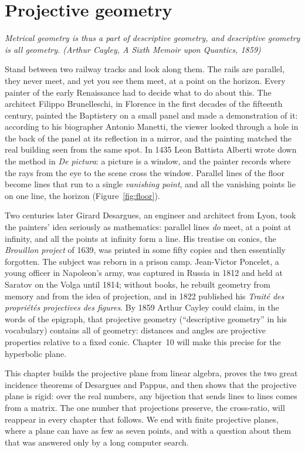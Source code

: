 \chapter{Projective geometry}\label{ch:projective}

\begin{center}\itshape
Metrical geometry is thus a part of descriptive geometry, and descriptive geometry is all geometry.
\upshape(Arthur Cayley, \emph{A Sixth Memoir upon Quantics}, 1859)
\end{center}

Stand between two railway tracks and look along them. The rails are parallel, they never meet, and yet you see them meet, at a point on
the horizon. Every painter of the early Renaissance had to decide what to do about this. The architect Filippo Brunelleschi, in Florence in
the first decades of the fifteenth century, painted the Baptistery on a small panel and made a demonstration of it: according to his
biographer Antonio Manetti, the viewer looked through a hole in the back of the panel at its reflection in a mirror, and the painting
matched the real building seen from the same spot. In 1435 Leon Battista Alberti wrote down the method in \emph{De pictura}: a picture is a
window, and the painter records where the rays from the eye to the scene cross the window. Parallel lines of the floor become lines that run
to a single \emph{vanishing point}, and all the vanishing points lie on one line, the horizon (Figure~\ref{fig:floor}).

Two centuries later Girard Desargues, an engineer and architect from Lyon, took the painters' idea seriously as mathematics: parallel lines
\emph{do} meet, at a point at infinity, and all the points at infinity form a line. His treatise on conics, the \emph{Brouillon project} of
1639, was printed in some fifty copies and then essentially forgotten. The subject was reborn in a prison camp. Jean-Victor Poncelet, a young
officer in Napoleon's army, was captured in Russia in 1812 and held at Saratov on the Volga until 1814; without books, he rebuilt geometry
from memory and from the idea of projection, and in 1822 published his \emph{Trait\'e des propri\'et\'es projectives des figures}. By 1859
Arthur Cayley could claim, in the words of the epigraph, that projective geometry (``descriptive geometry'' in his vocabulary) contains all of
geometry: distances and angles are projective properties relative to a fixed conic. Chapter~10 will make this precise for the hyperbolic plane.

This chapter builds the projective plane from linear algebra, proves the two great incidence theorems of Desargues and Pappus, and then shows
that the projective plane is rigid: over the real numbers, any bijection that sends lines to lines comes from a matrix. The one number that
projections preserve, the cross-ratio, will reappear in every chapter that follows. We end with finite projective planes, where a plane can have
as few as seven points, and with a question about them that was answered only by a long computer search.


